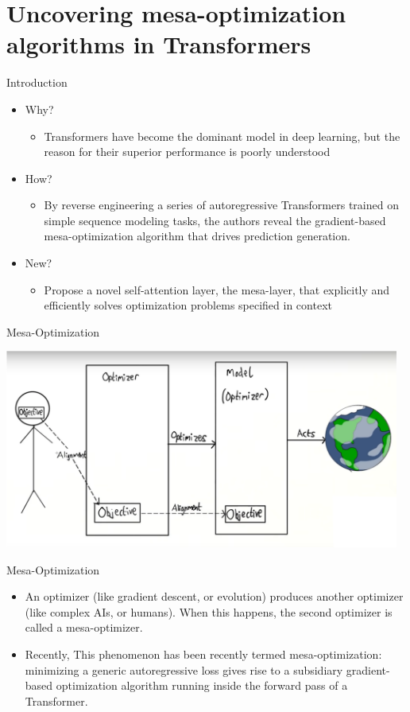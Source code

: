 \documentclass[aspectratio=1610,xcolor={dvipsnames},hyperref={colorlinks,unicode,linkcolor=violet,anchorcolor=BlueViolet,citecolor=YellowOrange,filecolor=black,urlcolor=Aquamarine}]{beamer}
\begin{document}
\section{Uncovering mesa-optimization algorithms in Transformers}
\label{sec:orgc0843ca}

\begin{frame}[label={sec:orgb5bb6c0}]{Introduction}
\begin{itemize}
\item Why?
\begin{itemize}
\item Transformers have become the dominant model in deep learning, but the reason for their superior performance is poorly understood
\end{itemize}
\item How?
\begin{itemize}
\item By reverse engineering a series of autoregressive Transformers trained on simple sequence modeling tasks, the authors reveal the gradient-based mesa-optimization algorithm that drives prediction generation.
\end{itemize}
\item New?
\begin{itemize}
\item Propose a novel self-attention layer, the mesa-layer, that explicitly and efficiently solves optimization problems specified in context
\end{itemize}
\end{itemize}
\end{frame}
\begin{frame}[label={sec:orged38c7b}]{Mesa-Optimization}
\begin{center}
\includegraphics[width=13cm]{./p9.png}
\end{center}
\end{frame}
\begin{frame}[label={sec:orgd6b84c7}]{Mesa-Optimization}
\begin{itemize}
\item An optimizer (like gradient descent, or evolution) produces another optimizer (like complex AIs, or humans). When this happens, the second optimizer is called a mesa-optimizer.

\item Recently, This phenomenon has been recently termed mesa-optimization: minimizing a generic autoregressive loss gives rise to a subsidiary gradient-based optimization algorithm running inside the forward pass of a Transformer.
\end{itemize}
\end{frame}
\end{document}
